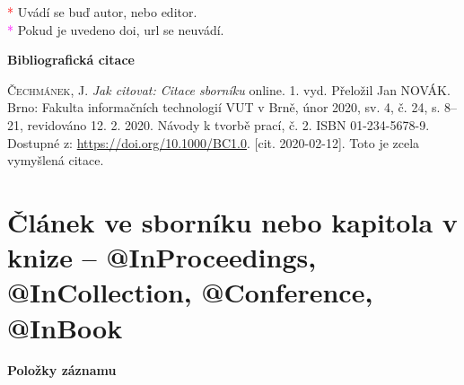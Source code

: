 \bigskip
\noindent \textcolor{red}{*} Uvádí se buď autor, nebo editor. \\
\noindent \textcolor{magenta}{*} Pokud je uvedeno doi, url se neuvádí.

\bigskip

\noindent \textbf{Bibliografická citace}

\medskip

\noindent \textsc{Čechmánek}, J. \textit{Jak citovat: Citace sborníku} online. 1. vyd. Přeložil Jan NOVÁK.
Brno: Fakulta informačních technologií VUT v Brně, únor 2020, sv. 4, č. 24, s. 8–21, revidováno 12. 2. 2020. Návody k tvorbě prací, č. 2. ISBN 01-234-5678-9. Dostupné z: \url{https://doi.org/10.1000/BC1.0}. [cit. 2020-02-12]. Toto je zcela vymyšlená citace.  
\newpage
\section*{Článek ve sborníku nebo kapitola v knize -- @InProceedings, @InCollection, @Conference, @InBook}
\label{pr-kapitola}
\noindent \textbf{Položky záznamu}

\medskip

